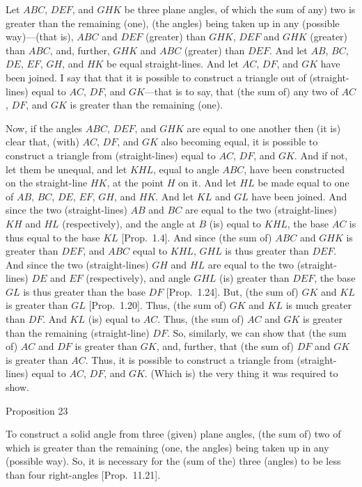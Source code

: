 Let $ABC$, $DEF$, and $GHK$ be three plane angles, of which the sum of any)
two is greater than the remaining (one), (the angles) being taken up in
any (possible way)---(that is), $ABC$ and $DEF$ (greater) than $GHK$,
$DEF$ and $GHK$ (greater) than $ABC$, and, further, $GHK$
and $ABC$ (greater) than $DEF$. And let $AB$, $BC$, $DE$, $EF$,
$GH$, and $HK$ be equal straight-lines. And let $AC$, $DF$, and
$GK$ have been joined. I say that that it is possible to construct a
triangle out of (straight-lines) equal to $AC$, $DF$, and $GK$---that is to say, that (the sum of) any two of $AC$, $DF$, and $GK$ is greater than
the remaining (one).

Now, if the angles $ABC$, $DEF$, and $GHK$ are equal to one another then
(it is)  clear that, (with) $AC$, $DF$, and $GK$ also becoming equal, it is
possible to construct a triangle from (straight-lines) equal to
$AC$, $DF$, and $GK$. And if not, let them be unequal, and let $KHL$,
equal to angle $ABC$, have been constructed on the straight-line
$HK$, at the point $H$ on it. And let $HL$ be made equal to one
of $AB$, $BC$, $DE$, $EF$, $GH$, and $HK$. And let $KL$
and $GL$ have been joined. And since the two (straight-lines) $AB$ and
$BC$ are equal to the two (straight-lines) $KH$ and $HL$ (respectively), 
and the angle at $B$ (is) equal to $KHL$, the base $AC$ is thus equal to the
base $KL$ [Prop.~1.4]. And since (the sum of)
$ABC$ and $GHK$ is greater than $DEF$, and $ABC$
equal to $KHL$,  $GHL$ is thus greater than $DEF$. And since the
two (straight-lines) $GH$ and $HL$ are equal to the two (straight-lines)
$DE$ and $EF$ (respectively), and angle $GHL$ (is) greater than $DEF$, the base $GL$ is thus greater than the base $DF$ [Prop.~1.24]. 
But, (the sum of) $GK$ and $KL$ is greater than $GL$ [Prop.~1.20]. Thus, (the sum of) $GK$ and $KL$
is much greater than $DF$.  And $KL$ (is) equal to $AC$. Thus, (the sum of)
$AC$ and $GK$ is greater than the remaining (straight-line) $DF$.
So, similarly, we can show that (the sum of) $AC$ and $DF$
is greater than $GK$, and, further, that (the sum of) $DF$ and $GK$
is greater than $AC$. Thus, it is possible to construct a triangle from
(straight-lines) equal to $AC$, $DF$, and $GK$. (Which is) the very
thing it was required to show.


\begin{center}
{\large Proposition 23}
\end{center}

To construct a solid angle from three (given)
plane angles,  (the sum of) two of which is greater than the remaining (one, the
angles) being taken up in any (possible way). So, it is necessary for the (sum of the) three (angles) to be less than four right-angles [Prop.~11.21].

